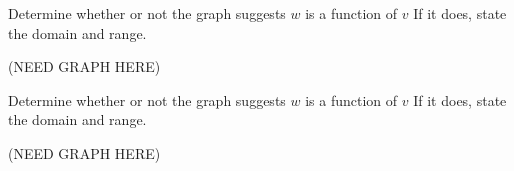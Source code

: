 \documentclass{ximera}
\begin{document}




\begin{problem}\label{graphfunctionfirstvw3}
    Determine whether or not the graph suggests $w$ is a function of $v$  If it does, state the domain and range.

    (NEED GRAPH HERE)
\end{problem}    




\begin{problem}\label{graphfunctionlastvw}
    Determine whether or not the graph suggests $w$ is a function of $v$  If it does, state the domain and range.

    (NEED GRAPH HERE)
\end{problem} 
\end{document}
